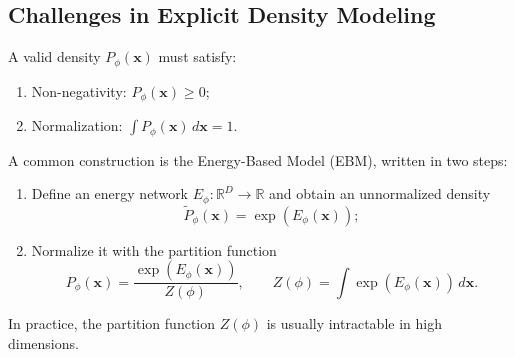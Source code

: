 \documentclass[11pt,a4paper]{article}
\newcommand{\bx}{\mathbf{x}}
\begin{document}
\subsection{Challenges in Explicit Density Modeling}
A valid density $P_\phi(\bx)$ must satisfy:
\begin{enumerate}
  \item Non-negativity: $P_\phi(\bx)\ge 0$;
  \item Normalization: $\int P_\phi(\bx)\,d\bx=1$.
\end{enumerate}
A common construction is the Energy-Based Model (EBM), written in two steps:
\begin{enumerate}
  \item Define an energy network $E_\phi:\mathbb{R}^D\to\mathbb{R}$ and obtain an unnormalized density
  \[
  \widetilde P_\phi(\bx)=\exp(E_\phi(\bx));
  \]
  \item Normalize it with the partition function
\[
P_\phi(\bx)=\frac{\exp(E_\phi(\bx))}{Z(\phi)},
\qquad
Z(\phi)=\int\exp(E_\phi(\bx))\,d\bx.
\]
\end{enumerate}
In practice, the partition function $Z(\phi)$ is usually intractable in high dimensions.
\end{document}
